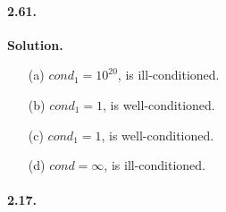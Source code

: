\documentclass[a4paper]{book}
\newenvironment{solution}%
{\noindent\textbf{Solution.}}%
{\qedhere}
\numberwithin{equation}{chapter}
\theoremstyle{definition}
\begin{document}
\paragraph*{2.61. }
\begin{solution}
    \begin{enumerate}
        \item [(a)] $cond_1 =  10^20$, is ill-conditioned.
        \item [(b)] $cond_1 = 1$, is well-conditioned.
        \item [(c)] $cond_1 = 1$, is well-conditioned.
        \item [(d)] $cond = \infty $, is ill-conditioned.
    \end{enumerate}
\end{solution}

\paragraph*{2.17. }
\end{document}
